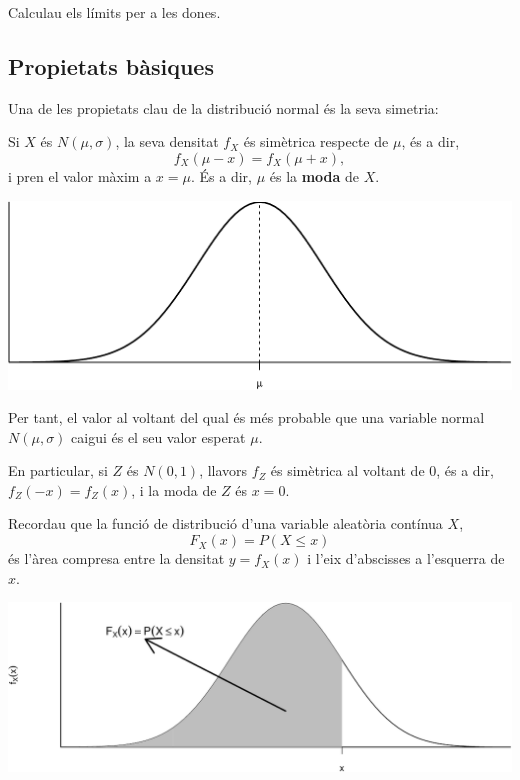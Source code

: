 \documentclass[
]{book}
\renewcommand{\leq}{\leqslant}
\newenvironment{rmdblock}[1]
  {
  \begin{itemize}
  \renewcommand{\labelitemi}{
    \raisebox{-.7\height}[0pt][0pt]{
      {\setkeys{Gin}{width=3em,keepaspectratio}\texttt{[image: Bioestadística-II\_files/figure-html/\#1]}}
    }
  }
  \setlength{\fboxsep}{1em}
  \begin{kframe}
  \item
  }
  {
  \end{kframe}
  \end{itemize}
  }
\newenvironment{rmdimportant}
  {\begin{rmdblock}{important}}
  {\end{rmdblock}}
\theoremstyle{definition}
\theoremstyle{definition}
\theoremstyle{definition}
\theoremstyle{remark}
\begin{document}
\begin{rmdexercici}
Calculau els límits per a les dones.
\end{rmdexercici}

\hypertarget{propietats-buxe0siques}{%
\subsection{Propietats bàsiques}\label{propietats-buxe0siques}}

Una de les propietats clau de la distribució normal és la seva simetria:

\begin{rmdimportant}
Si \(X\) és \(N(\mu,\sigma)\), la seva densitat \(f_X\) és simètrica respecte de \(\mu\), és a dir,
\[
f_{X}(\mu-x)=f_{X}(\mu+x),
\]
i pren el valor màxim a \(x=\mu\). És a dir, \(\mu\) és la \textbf{moda} de \(X\).
\end{rmdimportant}

\begin{center}\includegraphics[width=0.8\linewidth]{Bioestadistica-II_files/figure-latex/unnamed-chunk-95-1} \end{center}

Per tant, el valor al voltant del qual és més probable que una variable normal \(N(\mu,\sigma)\) caigui és el seu valor esperat \(\mu\).

En particular, si \(Z\) és \(N(0,1)\), llavors \(f_Z\) és simètrica al voltant de 0, és a dir, \(f_{Z}(-x)=f_{Z}(x)\), i la moda de \(Z\) és \(x=0\).

Recordau que la funció de distribució d'una variable aleatòria contínua \(X\),
\[
F_X(x)=P(X\leq x)
\]
és l'àrea compresa entre la densitat \(y=f_X(x)\) i l'eix d'abscisses a l'esquerra de \(x\).

\begin{center}\includegraphics[width=0.8\linewidth]{Bioestadistica-II_files/figure-latex/unnamed-chunk-96-1} \end{center}
\end{document}
